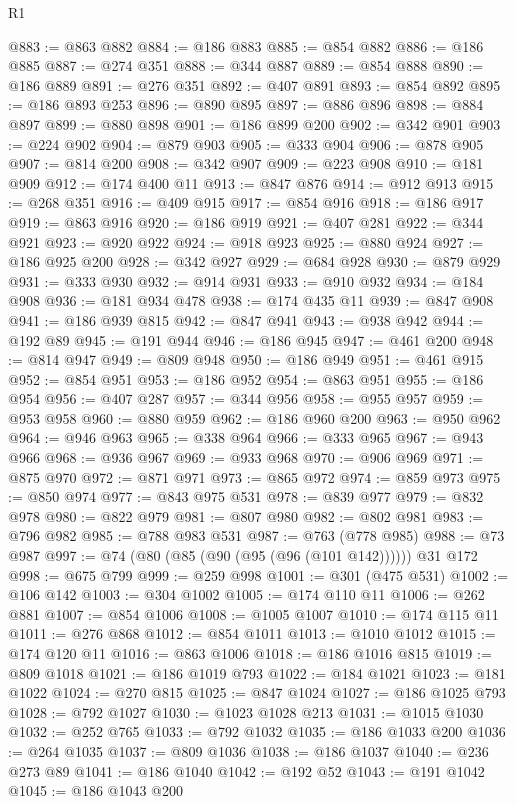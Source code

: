 \begin{lexlean}{R1}
\begin{coremodule}
@883 := @863 @882
@884 := @186 @883
@885 := @854 @882
@886 := @186 @885
@887 := @274 @351
@888 := @344 @887
@889 := @854 @888
@890 := @186 @889
@891 := @276 @351
@892 := @407 @891
@893 := @854 @892
@895 := @186 @893 @253
@896 := @890 @895
@897 := @886 @896
@898 := @884 @897
@899 := @880 @898
@901 := @186 @899 @200
@902 := @342 @901
@903 := @224 @902
@904 := @879 @903
@905 := @333 @904
@906 := @878 @905
@907 := @814 @200
@908 := @342 @907
@909 := @223 @908
@910 := @181 @909
@912 := @174 @400 @11
@913 := @847 @876
@914 := @912 @913
@915 := @268 @351
@916 := @409 @915
@917 := @854 @916
@918 := @186 @917
@919 := @863 @916
@920 := @186 @919
@921 := @407 @281
@922 := @344 @921
@923 := @920 @922
@924 := @918 @923
@925 := @880 @924
@927 := @186 @925 @200
@928 := @342 @927
@929 := @684 @928
@930 := @879 @929
@931 := @333 @930
@932 := @914 @931
@933 := @910 @932
@934 := @184 @908
@936 := @181 @934 @478
@938 := @174 @435 @11
@939 := @847 @908
@941 := @186 @939 @815
@942 := @847 @941
@943 := @938 @942
@944 := @192 @89
@945 := @191 @944
@946 := @186 @945
@947 := @461 @200
@948 := @814 @947
@949 := @809 @948
@950 := @186 @949
@951 := @461 @915
@952 := @854 @951
@953 := @186 @952
@954 := @863 @951
@955 := @186 @954
@956 := @407 @287
@957 := @344 @956
@958 := @955 @957
@959 := @953 @958
@960 := @880 @959
@962 := @186 @960 @200
@963 := @950 @962
@964 := @946 @963
@965 := @338 @964
@966 := @333 @965
@967 := @943 @966
@968 := @936 @967
@969 := @933 @968
@970 := @906 @969
@971 := @875 @970
@972 := @871 @971
@973 := @865 @972
@974 := @859 @973
@975 := @850 @974
@977 := @843 @975 @531
@978 := @839 @977
@979 := @832 @978
@980 := @822 @979
@981 := @807 @980
@982 := @802 @981
@983 := @796 @982
@985 := @788 @983 @531
@987 := @763 (@778 @985)
@988 := @73 @987
@997 := @74 (@80 (@85 (@90 (@95 (@96 (@101 @142)))))) @31 @172
@998 := @675 @799
@999 := @259 @998
@1001 := @301 (@475 @531)
@1002 := @106 @142
@1003 := @304 @1002
@1005 := @174 @110 @11
@1006 := @262 @881
@1007 := @854 @1006
@1008 := @1005 @1007
@1010 := @174 @115 @11
@1011 := @276 @868
@1012 := @854 @1011
@1013 := @1010 @1012
@1015 := @174 @120 @11
@1016 := @863 @1006
@1018 := @186 @1016 @815
@1019 := @809 @1018
@1021 := @186 @1019 @793
@1022 := @184 @1021
@1023 := @181 @1022
@1024 := @270 @815
@1025 := @847 @1024
@1027 := @186 @1025 @793
@1028 := @792 @1027
@1030 := @1023 @1028 @213
@1031 := @1015 @1030
@1032 := @252 @765
@1033 := @792 @1032
@1035 := @186 @1033 @200
@1036 := @264 @1035
@1037 := @809 @1036
@1038 := @186 @1037
@1040 := @236 @273 @89
@1041 := @186 @1040
@1042 := @192 @52
@1043 := @191 @1042
@1045 := @186 @1043 @200

\end{coremodule}
\end{lexlean}
